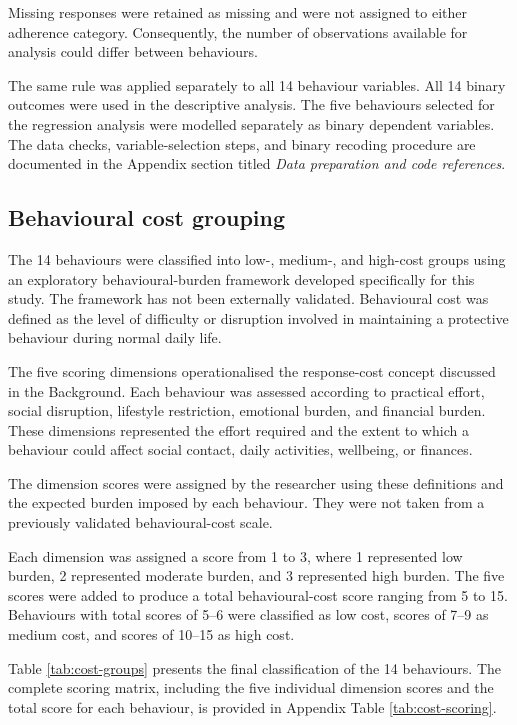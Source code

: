 \documentclass[
  12pt,
  a4paper,
]{article}
\begin{document}
Missing responses were retained as missing and were not assigned to
either adherence category. Consequently, the number of observations
available for analysis could differ between behaviours.

The same rule was applied separately to all 14 behaviour variables. All
14 binary outcomes were used in the descriptive analysis. The five
behaviours selected for the regression analysis were modelled separately
as binary dependent variables. The data checks, variable-selection
steps, and binary recoding procedure are documented in the Appendix
section titled \emph{Data preparation and code references}.

\subsection{Behavioural cost grouping}\label{behavioural-cost-grouping}

The 14 behaviours were classified into low-, medium-, and high-cost
groups using an exploratory behavioural-burden framework developed
specifically for this study. The framework has not been externally
validated. Behavioural cost was defined as the level of difficulty or
disruption involved in maintaining a protective behaviour during normal
daily life.

The five scoring dimensions operationalised the response-cost concept
discussed in the Background. Each behaviour was assessed according to
practical effort, social disruption, lifestyle restriction, emotional
burden, and financial burden. These dimensions represented the effort
required and the extent to which a behaviour could affect social
contact, daily activities, wellbeing, or finances.

The dimension scores were assigned by the researcher using these
definitions and the expected burden imposed by each behaviour. They were
not taken from a previously validated behavioural-cost scale.

Each dimension was assigned a score from 1 to 3, where 1 represented low
burden, 2 represented moderate burden, and 3 represented high burden.
The five scores were added to produce a total behavioural-cost score
ranging from 5 to 15. Behaviours with total scores of 5--6 were
classified as low cost, scores of 7--9 as medium cost, and scores of
10--15 as high cost.

Table \ref{tab:cost-groups} presents the final classification of the 14
behaviours. The complete scoring matrix, including the five individual
dimension scores and the total score for each behaviour, is provided in
Appendix Table \ref{tab:cost-scoring}.
\end{document}
